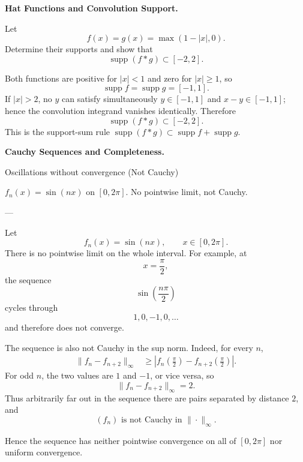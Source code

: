 \begin{problem}[CP-II-0515]
\label{prob:cp-ii-0515}
\textbf{Hat Functions and Convolution Support.}

\hspace*{1.5em}Let
\[
f(x)=g(x)=\max(1-|x|,0).
\]
Determine their supports and show that
\[
\operatorname{supp}(f*g)\subset[-2,2].
\]
\end{problem}

\begin{solution}
Both functions are positive for \(|x|<1\) and zero for \(|x|\ge1\), so
\[
\operatorname{supp}f=\operatorname{supp}g=[-1,1].
\]
If \(|x|>2\), no \(y\) can satisfy simultaneously \(y\in[-1,1]\) and \(x-y\in[-1,1]\); hence the convolution integrand vanishes identically. Therefore
\[
\boxed{\operatorname{supp}(f*g)\subset[-2,2].}
\]
This is the support-sum rule \(\operatorname{supp}(f*g)\subset\operatorname{supp}f+\operatorname{supp}g\).
\end{solution}


\begin{problem}[CP-II-0516]
\label{prob:cp-ii-0516}
\textbf{Cauchy Sequences and Completeness.}

\hspace*{1.5em}Oscillations without convergence (Not Cauchy)

$f_n(x)=\sin(nx)$ on $[0,2\pi]$.
No pointwise limit, not Cauchy.

---
\end{problem}

\begin{solution}
Let
\[
f_n(x)=\sin(nx),
\qquad
x\in[0,2\pi].
\]
There is no pointwise limit on the whole interval. For example, at
\[
x=\frac{\pi}{2},
\]
the sequence
\[
\sin\left(\frac{n\pi}{2}\right)
\]
cycles through
\[
1,0,-1,0,\ldots
\]
and therefore does not converge.

The sequence is also not Cauchy in the sup norm. Indeed, for every \(n\),
\[
\begin{aligned}
\|f_n-f_{n+2}\|_\infty
&\ge
\left|
f_n\left(\frac{\pi}{2}\right)
-
f_{n+2}\left(\frac{\pi}{2}\right)
\right|.
\end{aligned}
\]
For odd \(n\), the two values are \(1\) and \(-1\), or vice versa, so
\[
\|f_n-f_{n+2}\|_\infty=2.
\]
Thus arbitrarily far out in the sequence there are pairs separated by distance \(2\), and
\[
\boxed{
(f_n)\text{ is not Cauchy in }\|\cdot\|_\infty.
}
\]

Hence the sequence has neither pointwise convergence on all of \([0,2\pi]\) nor uniform
convergence.
\end{solution}


